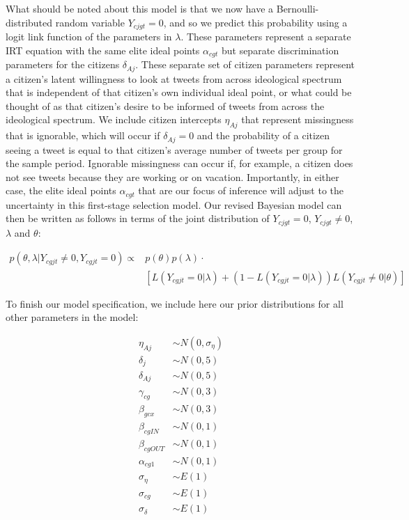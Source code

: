 \documentclass[12pt]{article}
\begin{document}
What should be noted about this model is that we now have a Bernoulli-distributed random variable $Y_{cjgt}=0$, and so we predict this probability using a logit link function of the parameters in $\lambda$. These parameters represent a separate IRT equation with the same elite ideal points $\alpha_{cgt}$ but separate discrimination parameters for the citizens $\delta_{Aj}$. These separate set of citizen parameters represent a citizen's latent willingness to look at tweets from across ideological spectrum that is independent of that citizen's own individual ideal point, or what could be thought of as that citizen's desire to be informed of tweets from across the ideological spectrum. We include citizen intercepts $\eta_{Aj}$ that represent missingness that is ignorable, which will occur if $\delta_{Aj}=0$ and the probability of a citizen seeing a tweet is equal to that citizen's average number of tweets per group for the sample period. Ignorable missingness can occur if, for example, a citizen does not see tweets because they are working or on vacation. Importantly, in either case, the elite ideal points $\alpha_{cgt}$ that are our focus of inference will adjust to the uncertainty in this first-stage selection model. Our revised Bayesian model can then be written as follows in terms of the joint distribution of $Y_{cjgt}=0$, $Y_{cjgt}\neq0$, $\lambda$ and $\theta$:

\begin{align}
p(\theta,\lambda|Y_{cgjt}\neq0,Y_{cgjt}=0) \propto& p(\theta)p(\lambda) \cdot \\
&[ L(Y_{cgjt}=0|\lambda) + (1-L(Y_{cgjt}=0|\lambda))L(Y_{cgjt}\neq0|\theta)]
\end{align}

To finish our model specification, we include here our prior distributions for all other parameters in the model:

\begin{align}
\eta_{Aj} &\sim N(0,\sigma_{\eta})\\
\delta_j &\sim N(0,5) \\
\delta_{Aj} &\sim N(0,5) \\
\gamma_{cg} &\sim N(0,3)\\
\beta_{gcx} &\sim  N(0,3)\\
\beta_{cgIN} &\sim N(0,1)\\
\beta_{cgOUT} &\sim N(0,1)\\ 
\alpha_{cg1} &\sim N(0,1)\\
\sigma_{\eta} &\sim E(1)\\
\sigma_{cg} &\sim E(1)\\
\sigma_{\delta} &\sim E(1)
\end{align}
\end{document}
